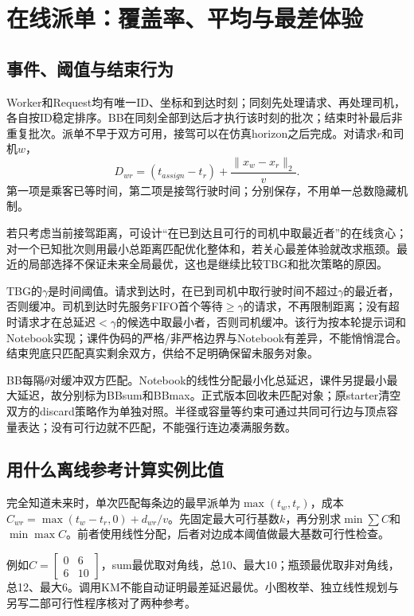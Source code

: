 \section{在线派单：覆盖率、平均与最差体验}
\subsection{事件、阈值与结束行为}
Worker和Request均有唯一ID、坐标和到达时刻；同刻先处理请求、再处理司机，各自按ID稳定排序。BB在同刻全部到达后才执行该时刻的批次；结束时补最后非重复批次。派单不早于双方可用，接驾可以在仿真horizon之后完成。对请求$r$和司机$w$，
\begin{equation}
D_{wr}=(t_{assign}-t_r)+\frac{\lVert x_w-x_r\rVert_2}{v}.
\end{equation}
第一项是乘客已等时间，第二项是接驾行驶时间；分别保存，不用单一总数隐藏机制。

若只考虑当前接驾距离，可设计“在已到达且可行的司机中取最近者”的在线贪心；对一个已知批次则用最小总距离匹配优化整体和，若关心最差体验就改求瓶颈。最近的局部选择不保证未来全局最优，这也是继续比较TBG和批次策略的原因。

TBG的$\gamma$是时间阈值。请求到达时，在已到司机中取行驶时间不超过$\gamma$的最近者，否则缓冲。司机到达时先服务FIFO首个等待$\ge\gamma$的请求，不再限制距离；没有超时请求才在总延迟$<\gamma$的候选中取最小者，否则司机缓冲。该行为按本轮提示词和Notebook实现；课件伪码的严格/非严格边界与Notebook有差异，不能悄悄混合。结束兜底只匹配真实剩余双方，供给不足明确保留未服务对象。

BB每隔$\theta$对缓冲双方匹配。Notebook的线性分配最小化总延迟，课件另提最小最大延迟，故分别标为BBsum和BBmax。正式版本回收未匹配对象；原starter清空双方的discard策略作为单独对照。半径或容量等约束可通过共同可行边与顶点容量表达；没有可行边就不匹配，不能强行连边凑满服务数。

\subsection{用什么离线参考计算实例比值}
完全知道未来时，单次匹配每条边的最早派单为$\max(t_w,t_r)$，成本$C_{wr}=\max(t_w-t_r,0)+d_{wr}/v$。先固定最大可行基数$k$，再分别求$\min\sum C$和$\min\max C$。前者使用线性分配\cite{scipy}，后者对边成本阈值做最大基数可行性检查。

例如$C=\left[\begin{smallmatrix}0&6\\6&10\end{smallmatrix}\right]$，sum最优取对角线，总10、最大10；瓶颈最优取非对角线，总12、最大6。调用KM不能自动证明最差延迟最优。小图枚举、独立线性规划与另写二部可行性程序核对了两种参考。

